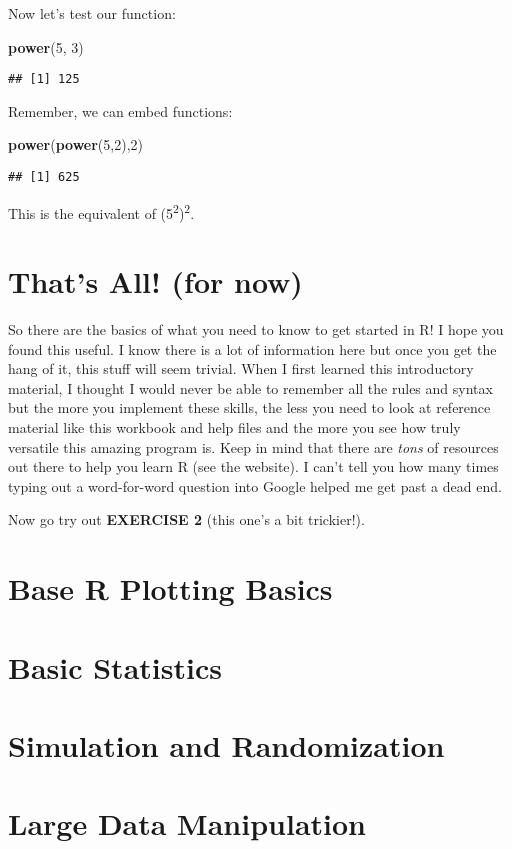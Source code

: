 \documentclass[]{book}
\newenvironment{Shaded}{\begin{snugshade}}{\end{snugshade}}
\newcommand{\KeywordTok}[1]{\textcolor[rgb]{0.13,0.29,0.53}{\textbf{#1}}}
\newcommand{\DecValTok}[1]{\textcolor[rgb]{0.00,0.00,0.81}{#1}}
\newcommand{\NormalTok}[1]{#1}
\theoremstyle{definition}
\theoremstyle{definition}
\theoremstyle{definition}
\theoremstyle{remark}
\begin{document}
Now let's test our function:

\begin{Shaded}
\begin{Highlighting}[]
\KeywordTok{power}\NormalTok{(}\DecValTok{5}\NormalTok{, }\DecValTok{3}\NormalTok{)}
\end{Highlighting}
\end{Shaded}

\begin{verbatim}
## [1] 125
\end{verbatim}

Remember, we can embed functions:

\begin{Shaded}
\begin{Highlighting}[]
\KeywordTok{power}\NormalTok{(}\KeywordTok{power}\NormalTok{(}\DecValTok{5}\NormalTok{,}\DecValTok{2}\NormalTok{),}\DecValTok{2}\NormalTok{)}
\end{Highlighting}
\end{Shaded}

\begin{verbatim}
## [1] 625
\end{verbatim}

This is the equivalent of (5\textsuperscript{2})\textsuperscript{2}.

\chapter{That's All! (for now)}\label{thats-all-for-now}

So there are the basics of what you need to know to get started in R! I
hope you found this useful. I know there is a lot of information here
but once you get the hang of it, this stuff will seem trivial. When I
first learned this introductory material, I thought I would never be
able to remember all the rules and syntax but the more you implement
these skills, the less you need to look at reference material like this
workbook and help files and the more you see how truly versatile this
amazing program is. Keep in mind that there are \emph{tons} of resources
out there to help you learn R (see the website). I can't tell you how
many times typing out a word-for-word question into Google helped me get
past a dead end.

Now go try out \textbf{EXERCISE 2} (this one's a bit trickier!).

\chapter{Base R Plotting Basics}\label{ch2}

\chapter{Basic Statistics}\label{ch3}

\chapter{Simulation and Randomization}\label{ch4}

\chapter{Large Data Manipulation}\label{ch5}


\end{document}
